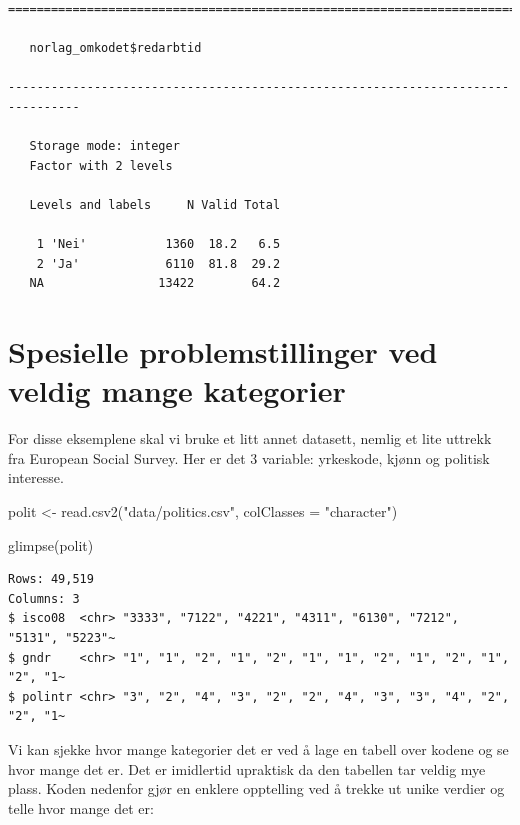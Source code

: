 \documentclass[
  letterpaper,
  DIV=11,
  numbers=noendperiod]{scrreprt}
\newenvironment{Shaded}{\begin{snugshade}}{\end{snugshade}}
\newcommand{\AttributeTok}[1]{\textcolor[rgb]{0.40,0.45,0.13}{#1}}
\newcommand{\FunctionTok}[1]{\textcolor[rgb]{0.28,0.35,0.67}{#1}}
\newcommand{\NormalTok}[1]{\textcolor[rgb]{0.00,0.23,0.31}{#1}}
\newcommand{\OtherTok}[1]{\textcolor[rgb]{0.00,0.23,0.31}{#1}}
\newcommand{\StringTok}[1]{\textcolor[rgb]{0.13,0.47,0.30}{#1}}
\theoremstyle{definition}
\theoremstyle{remark}
\begin{document}
\begin{verbatim}
================================================================================

   norlag_omkodet$redarbtid

--------------------------------------------------------------------------------

   Storage mode: integer
   Factor with 2 levels

   Levels and labels     N Valid Total
                                      
    1 'Nei'           1360  18.2   6.5
    2 'Ja'            6110  81.8  29.2
   NA                13422        64.2
\end{verbatim}

\hypertarget{spesielle-problemstillinger-ved-veldig-mange-kategorier}{%
\section{Spesielle problemstillinger ved veldig mange
kategorier}\label{spesielle-problemstillinger-ved-veldig-mange-kategorier}}

For disse eksemplene skal vi bruke et litt annet datasett, nemlig et
lite uttrekk fra European Social Survey. Her er det 3 variable:
yrkeskode, kjønn og politisk interesse.

\begin{Shaded}
\begin{Highlighting}[]
\NormalTok{polit }\OtherTok{\textless{}{-}} \FunctionTok{read.csv2}\NormalTok{(}\StringTok{"data/politics.csv"}\NormalTok{, }\AttributeTok{colClasses =} \StringTok{"character"}\NormalTok{)}

\FunctionTok{glimpse}\NormalTok{(polit)}
\end{Highlighting}
\end{Shaded}

\begin{verbatim}
Rows: 49,519
Columns: 3
$ isco08  <chr> "3333", "7122", "4221", "4311", "6130", "7212", "5131", "5223"~
$ gndr    <chr> "1", "1", "2", "1", "2", "1", "1", "2", "1", "2", "1", "2", "1~
$ polintr <chr> "3", "2", "4", "3", "2", "2", "4", "3", "3", "4", "2", "2", "1~
\end{verbatim}

Vi kan sjekke hvor mange kategorier det er ved å lage en tabell over
kodene og se hvor mange det er. Det er imidlertid upraktisk da den
tabellen tar veldig mye plass. Koden nedenfor gjør en enklere opptelling
ved å trekke ut unike verdier og telle hvor mange det er:
\end{document}
